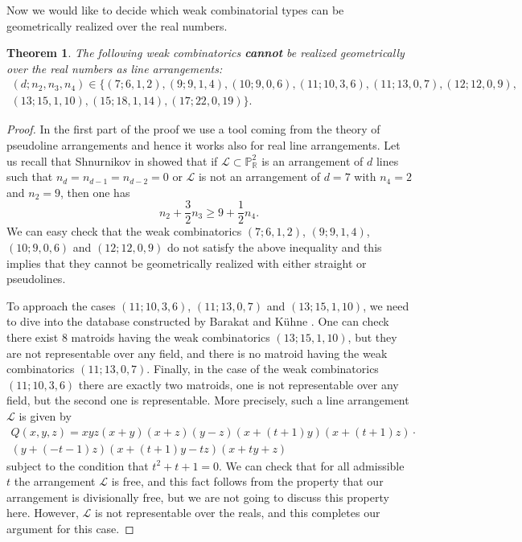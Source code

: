 \documentclass[12pt]{article}
\theoremstyle{plain}
\newtheorem{theorem}[thm]{Theorem}
\theoremstyle{definition}
\begin{document}
Now we would like to decide which weak combinatorial types can be geometrically realized over the real numbers.
\begin{theorem}
\label{classy}
The following weak combinatorics \textbf{cannot} be realized geometrically over the real numbers as line arrangements:
\begin{multline*}
(d;n_{2},n_{3},n_{4}) \in \{(7;6,1,2), (9;9,1,4), (10;9,0,6), (11;10,3,6), (11;13,0,7), (12;12,0,9), \\ (13;15,1,10), (15;18,1,14), (17;22,0,19)\}.    
\end{multline*}
\end{theorem}
\begin{proof}
In the first part of the proof we use a tool coming from the theory of pseudoline arrangements and hence it works also for real line arrangements. Let us recall that Shnurnikov in \cite{Sh} showed that if $\mathcal{L}\subset \mathbb{P}^{2}_{\mathbb{R}}$ is an arrangement of $d$ lines such that $n_{d}=n_{d-1}=n_{d-2}=0$ or $\mathcal{L}$ is not an arrangement of $d=7$ with $n_{4}=2$ and $n_{2}=9$, then one has
\begin{equation}
\label{Shnurnikov}
n_{2} + \frac{3}{2}n_{3} \geq 9 + \frac{1}{2}n_{4}.
\end{equation}
We can easy check that the weak combinatorics $(7;6,1,2)$, $(9;9,1,4)$, $(10;9,0,6)$ and $(12; 12,0,9)$ do not satisfy the above inequality and this implies that they cannot be geometrically realized with either straight or pseudolines.

To approach the cases $(11; 10,3,6)$, $(11;13,0,7)$ and $(13;15,1,10)$, we need to dive into the database constructed by Barakat and K\"uhne \cite{BK}. One can check there exist $8$ matroids having the weak combinatorics $(13;15,1,10)$, but they are not representable over any field, and there is no matroid having the weak combinatorics $(11;13,0,7)$. Finally, in the case of the weak combinatorics $(11; 10,3,6)$ there are exactly two matroids, one is not representable over any field, but the second one is representable. More precisely, such a line arrangement $\mathcal{L}$ is given by
\begin{multline*}
Q(x,y,z) = xyz(x+y)(x+z)(y-z)(x+(t+1)y)(x+(t+1)z)\cdot \\ (y+(-t-1)z)(x+(t+1)y-tz)(x+ty+z)    
\end{multline*}
subject to the condition that $t^{2}+t+1=0$. We can check that for all admissible $t$ the arrangement $\mathcal{L}$ is free, and this fact follows from the property that our arrangement is divisionally free, but we are not going to discuss this property here. However, $\mathcal{L}$ is not representable over the reals, and this completes our argument for this case.


\end{proof}
\end{document}
